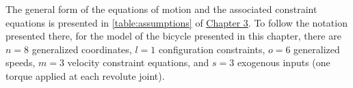 The general form of the equations of motion and the associated constraint
equations is presented in \autoref{table:assumptions} of
\hyperref[chapter3]{Chapter 3}. To follow the notation presented there, for the
model of the bicycle presented in this chapter, there are $n=8$ generalized
coordinates, $l=1$ configuration constraints, $o=6$ generalized speeds, $m=3$
velocity constraint equations, and $s=3$ exogenous inputs (one torque applied
at each revolute joint).

